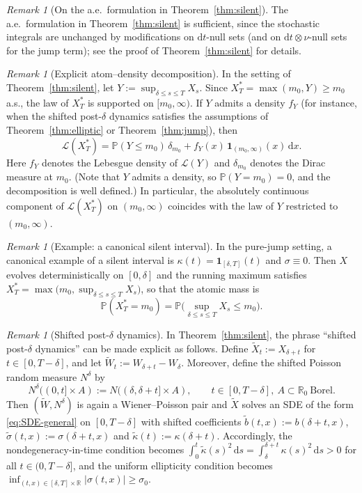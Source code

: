 \documentclass[11pt]{article}
\newcommand{\R}{\mathbb{R}}
\newcommand{\Pbb}{\mathbb{P}}
\newcommand{\1}{\mathbf{1}}
\newcommand{\law}{\mathcal{L}}
\newcommand{\dd}{\mathrm{d}}
\newcommand{\dx}{\,\dd x}
\newcommand{\Xstar}{X^{\ast}}
\theoremstyle{plain}
\theoremstyle{definition}
\theoremstyle{remark}
\newtheorem{remark}[theorem]{Remark}
\begin{document}
\begin{remark}[On the a.e.\ formulation in Theorem~\ref{thm:silent}]
The a.e.\ formulation in Theorem~\ref{thm:silent} is sufficient, since the stochastic integrals are unchanged by modifications on $\dd t$-null sets
(and on $\dd t\otimes\nu$-null sets for the jump term); see the proof of Theorem~\ref{thm:silent} for details.
\end{remark}

\begin{remark}[Explicit atom--density decomposition]
In the setting of Theorem~\ref{thm:silent}, let $Y:=\sup_{\delta\le s\le T}X_s$.
Since $\Xstar_T=\max(m_0,Y)\ge m_0$ a.s., the law of $\Xstar_T$ is supported on $[m_0,\infty)$.
If $Y$ admits a density $f_Y$ (for instance, when the shifted post-$\delta$ dynamics satisfies the assumptions of
Theorem~\ref{thm:elliptic} or Theorem~\ref{thm:jump}), then
\[
\law(\Xstar_T)=\Pbb(Y\le m_0)\,\delta_{m_0}+ f_Y(x)\,\1_{(m_0,\infty)}(x)\dx.
\]
Here $f_Y$ denotes the Lebesgue density of $\law(Y)$ and $\delta_{m_0}$ denotes the Dirac measure at $m_0$.
(Note that $Y$ admits a density, so $\Pbb(Y=m_0)=0$, and the decomposition is well defined.)
In particular, the absolutely continuous component of $\law(\Xstar_T)$ on $(m_0,\infty)$ coincides with the law of $Y$
restricted to $(m_0,\infty)$.
\end{remark}


\begin{remark}[Example: a canonical silent interval]
In the pure-jump setting, a canonical example of a silent interval is $\kappa(t)=\1_{[\delta,T]}(t)$ and $\sigma\equiv0$.
Then $X$ evolves deterministically on $[0,\delta]$ and the running maximum satisfies
$\Xstar_T=\max\big(m_0,\sup_{\delta\le s\le T}X_s\big)$, so that the atomic mass is
\[
\Pbb(\Xstar_T=m_0)=\Pbb\Big(\sup_{\delta\le s\le T}X_s\le m_0\Big).
\]
\end{remark}

\begin{remark}[Shifted post-$\delta$ dynamics]
In Theorem~\ref{thm:silent}, the phrase ``shifted post-$\delta$ dynamics'' can be made explicit as follows.
Define $\tilde X_t:=X_{\delta+t}$ for $t\in[0,T-\delta]$, and let $\tilde W_t:=W_{\delta+t}-W_\delta$.
Moreover, define the shifted Poisson random measure $N^\delta$ by
\[
N^\delta((0,t]\times A):=N((\delta,\delta+t]\times A),\qquad t\in[0,T-\delta],\ A\subset\R_0\ \text{Borel}.
\]
Then $(\tilde W,N^\delta)$ is again a Wiener--Poisson pair and $\tilde X$ solves an SDE of the form \eqref{eq:SDE-general} on $[0,T-\delta]$
with shifted coefficients $\tilde b(t,x):=b(\delta+t,x)$, $\tilde\sigma(t,x):=\sigma(\delta+t,x)$ and $\tilde\kappa(t):=\kappa(\delta+t)$.
Accordingly, the nondegeneracy-in-time condition becomes
$\int_0^t \tilde\kappa(s)^2\,\dd s=\int_\delta^{\delta+t}\kappa(s)^2\,\dd s>0$ for all $t\in(0,T-\delta]$,
and the uniform ellipticity condition becomes $\inf_{(t,x)\in[\delta,T]\times\R}|\sigma(t,x)|\ge\sigma_0$.
\end{remark}
\end{document}
